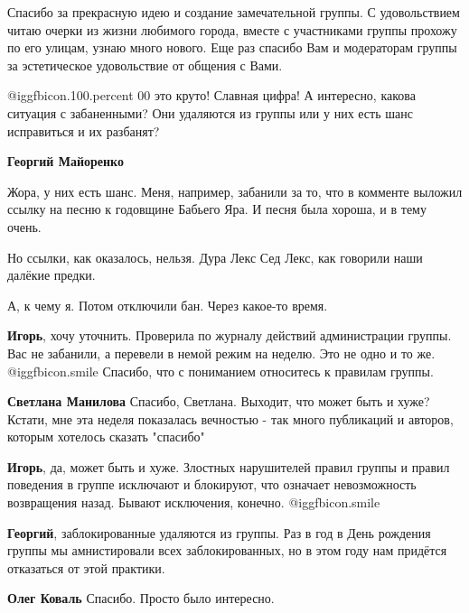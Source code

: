 \begin{itemize}

Спасибо за прекрасную идею и создание замечательной группы. С удовольствием
читаю очерки из жизни любимого города, вместе с участниками группы прохожу по
его улицам, узнаю много нового. Еще раз спасибо Вам и модераторам группы за
эстетическое удовольствие от общения с Вами.

 @igg{fbicon.100.percent}  00 это круто! Славная цифра! А интересно, какова ситуация с забаненными? Они удаляются из группы или у них есть шанс исправиться и их разбанят?

\begin{itemize} %
\textbf{Георгий Майоренко} 

Жора, у них есть шанс. Меня, например, забанили за то, что в комменте выложил
ссылку на песню к годовщине Бабьего Яра. И песня была хороша, и в тему очень.

Но ссылки, как оказалось, нельзя. Дура Лекс Сед Лекс, как говорили наши далёкие
предки.

А, к чему я. Потом отключили бан. Через какое-то время.

\begin{itemize} %

\textbf{Игорь}, хочу уточнить. Проверила по журналу действий администрации группы. Вас не забанили, а перевели в немой режим на неделю. Это не одно и то же. @igg{fbicon.smile} Спасибо, что с пониманием относитесь к правилам группы.

\textbf{Светлана Манилова} Спасибо, Светлана. Выходит, что может быть и хуже? Кстати, мне эта неделя показалась вечностью - так много публикаций и авторов, которым хотелось сказать "спасибо"


\textbf{Игорь}, да, может быть и хуже. Злостных нарушителей правил группы и правил поведения в группе исключают и блокируют, что означает невозможность возвращения назад. Бывают исключения, конечно.  @igg{fbicon.smile} 
\end{itemize} %


\textbf{Георгий}, заблокированные удаляются из группы. Раз в год в День
рождения группы мы амнистировали всех заблокированных, но в этом году нам
придётся отказаться от этой практики.

\begin{itemize} %
\textbf{Олег Коваль} Спасибо. Просто было интересно.
\end{itemize} %


\end{itemize}
\end{itemize}
